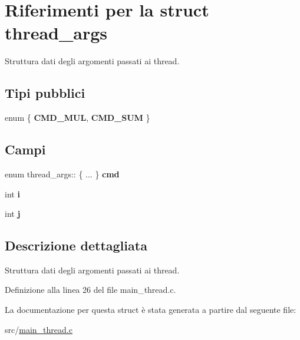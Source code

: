 \hypertarget{structthread__args}{}\section{Riferimenti per la struct thread\+\_\+args}
\label{structthread__args}


Struttura dati degli argomenti passati ai thread.  


\subsection*{Tipi pubblici}
\begin{DoxyCompactItemize}
\item 
\mbox{\label{structthread__args_a7f9956ebb5b26226ed49641b3c26084b}} 
enum \{ {\bfseries C\+M\+D\+\_\+\+M\+UL}, 
{\bfseries C\+M\+D\+\_\+\+S\+UM}
 \}
\end{DoxyCompactItemize}
\subsection*{Campi}
\begin{DoxyCompactItemize}
\item 
\mbox{\label{structthread__args_aac9542cb73f7e46016a090a57e067cad}} 
enum thread\+\_\+args\+:: \{ ... \}  {\bfseries cmd}
\item 
\mbox{\label{structthread__args_adb2e89b8f0ffdd7adaf5dd5bd951e206}} 
int {\bfseries i}
\item 
\mbox{\label{structthread__args_a1c73a33c18e20dbc3b48805826a4098c}} 
int {\bfseries j}
\end{DoxyCompactItemize}


\subsection{Descrizione dettagliata}
Struttura dati degli argomenti passati ai thread. 

Definizione alla linea 26 del file main\+\_\+thread.\+c.



La documentazione per questa struct è stata generata a partire dal seguente file\+:\begin{DoxyCompactItemize}
\item 
src/\hyperlink{main__thread_8c}{main\+\_\+thread.\+c}\end{DoxyCompactItemize}
